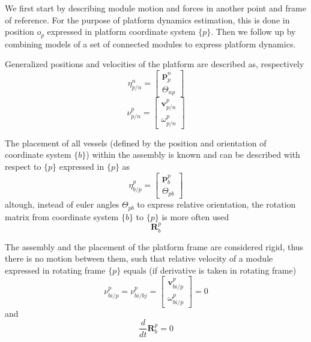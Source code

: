 We first start by describing module motion and forces in another point and frame of reference. For the purpose of platform dynamics estimation, this is done in position $o_{p}$ expressed in platform coordinate system $\{p\}$. Then we follow up by combining models of a set of connected modules to express platform dynamics. 

Generalized positions and velocities of the platform are described as, respectively
\begin{equation}
\eta_{p/n}^{n} = \begin{bmatrix} \textbf{p}^{n}_{p} \\[8pt]  \Theta_{np} \end{bmatrix}
\end{equation}
\begin{equation}
\nu_{p/n}^{p} = \begin{bmatrix} \textbf{v}^{p}_{p/n} \\[8pt]  \omega^{p}_{p/n} \end{bmatrix}
\end{equation}

The placement of all vessels (defined by the position and orientation of coordinate system $\{b\}$) within the assembly is known and can be described with respect to $\{p\}$ expressed in $\{p\}$ as
\begin{equation}
\eta_{b/p}^{p} = \begin{bmatrix} \textbf{p}^{p}_{b} \\[8pt]  \Theta_{pb} \end{bmatrix}
\end{equation}
altough, instead of euler angles $\Theta_{pb}$ to express relative orientation, the rotation matrix from coordinate system $\{b\}$ to $\{p\}$ is more often used 
\begin{equation}
\textbf{R}^{p}_{b}
\end{equation}

The assembly and the placement of the platform frame are considered rigid, thus there is no motion between them, such that relative velocity of a module expressed in rotating frame $\{p\}$ equals (if derivative is taken in rotating frame)
\begin{equation}
\nu_{bi/p}^{p} = \nu_{bi/bj}^{p} = \begin{bmatrix} \textbf{v}^{p}_{bi/p} \\[8pt]  \omega^{p}_{bi/p} \end{bmatrix} = 0
\label{eq:derivNoMotionInPlatform}
\end{equation}
and 
\begin{equation}
\frac{d}{dt} \textbf{R}^{p}_{b} = 0
\end{equation}


